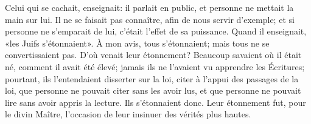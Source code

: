 Celui qui se cachait, enseignait:
	il parlait en public, et personne ne mettait la main sur lui.
Il ne se faisait pas connaître, afin de nous servir d’exemple;
	et si personne ne s’emparait de lui, c’était l’effet de sa puissance.
Quand il enseignait, «les Juifs s’étonnaient».
	À mon avis, tous s’étonnaient; mais tous ne se convertissaient pas.
D’où venait leur étonnement?
Beaucoup savaient où il était né, comment il avait été élevé;
	jamais ils ne l’avaient vu apprendre les Écritures;
	pourtant, ils l’entendaient disserter sur la loi,
	citer à l’appui des passages de la loi,
	que personne ne pouvait citer sans les avoir lus,
	et que personne ne pouvait lire sans avoir appris la lecture.
Ils s’étonnaient donc.
Leur étonnement fut, pour le divin Maître,
	l’occasion de leur insinuer des vérités plus hautes.
